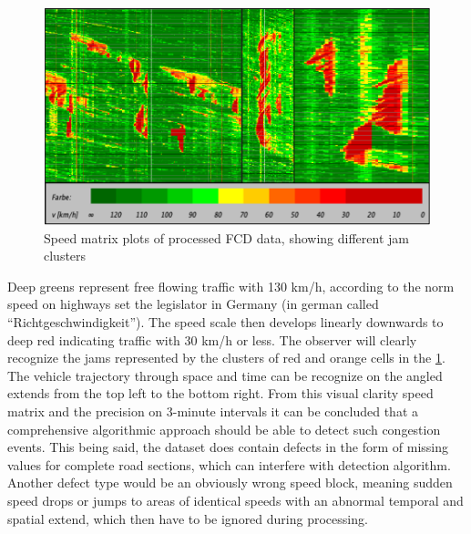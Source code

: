 \begin{figure}[ht]
	\centering
	\includegraphics[scale=0.7]{images/SpeedMatrixPlot_mutiple}
	\caption{Speed matrix plots of processed FCD data, showing different jam clusters}
	\label{img:speedMatrixPlot_mutipleMixedClusters}
\end{figure}

Deep greens represent free flowing traffic with 130 km/h, according to the norm speed on highways set the legislator in Germany (in german called “Richtgeschwindigkeit”). The speed scale then develops linearly downwards to deep red indicating traffic with 30 km/h or less. The observer will clearly recognize the jams represented by the clusters of red and orange cells in the \cref{img:speedMatrixPlot_mutipleMixedClusters}. The vehicle trajectory through space and time can be recognize on the angled extends from the top left to the bottom right. From this visual clarity speed matrix and the precision on 3-minute intervals it can be concluded that a comprehensive algorithmic approach should be able to detect such congestion events. This being said, the dataset does contain defects in the form of missing values for complete road sections, which can interfere with detection algorithm. Another defect type would be an obviously wrong speed block, meaning sudden speed drops or jumps to areas of identical speeds with an abnormal temporal and spatial extend, which then have to be ignored during processing. 

